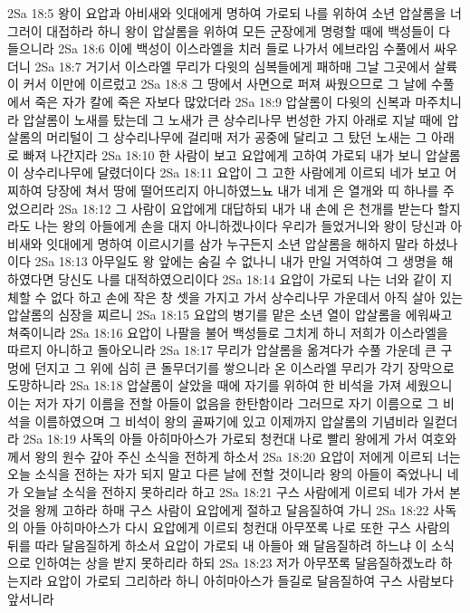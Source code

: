 2Sa 18:5  왕이 요압과 아비새와 잇대에게 명하여 가로되 나를 위하여 소년 압살롬을 너그러이 대접하라 하니 왕이 압살롬을 위하여 모든 군장에게 명령할 때에 백성들이 다 들으니라
2Sa 18:6  이에 백성이 이스라엘을 치러 들로 나가서 에브라임 수풀에서 싸우더니
2Sa 18:7  거기서 이스라엘 무리가 다윗의 심복들에게 패하매 그날 그곳에서 살륙이 커서 이만에 이르렀고
2Sa 18:8  그 땅에서 사면으로 퍼져 싸웠으므로 그 날에 수풀에서 죽은 자가 칼에 죽은 자보다 많았더라
2Sa 18:9  압살롬이 다윗의 신복과 마주치니라 압살롬이 노새를 탔는데 그 노새가 큰 상수리나무 번성한 가지 아래로 지날 때에 압살롬의 머리털이 그 상수리나무에 걸리매 저가 공중에 달리고 그 탔던 노새는 그 아래로 빠져 나간지라
2Sa 18:10  한 사람이 보고 요압에게 고하여 가로되 내가 보니 압살롬이 상수리나무에 달렸더이다
2Sa 18:11  요압이 그 고한 사람에게 이르되 네가 보고 어찌하여 당장에 쳐서 땅에 떨어뜨리지 아니하였느뇨 내가 네게 은 열개와 띠 하나를 주었으리라
2Sa 18:12  그 사람이 요압에게 대답하되 내가 내 손에 은 천개를 받는다 할지라도 나는 왕의 아들에게 손을 대지 아니하겠나이다 우리가 들었거니와 왕이 당신과 아비새와 잇대에게 명하여 이르시기를 삼가 누구든지 소년 압살롬을 해하지 말라 하셨나이다
2Sa 18:13  아무일도 왕 앞에는 숨길 수 없나니 내가 만일 거역하여 그 생명을 해하였다면 당신도 나를 대적하였으리이다
2Sa 18:14  요압이 가로되 나는 너와 같이 지체할 수 없다 하고 손에 작은 창 셋을 가지고 가서 상수리나무 가운데서 아직 살아 있는 압살롬의 심장을 찌르니
2Sa 18:15  요압의 병기를 맡은 소년 열이 압살롬을 에워싸고 쳐죽이니라
2Sa 18:16  요압이 나팔을 불어 백성들로 그치게 하니 저희가 이스라엘을 따르지 아니하고 돌아오니라
2Sa 18:17  무리가 압살롬을 옮겨다가 수풀 가운데 큰 구멍에 던지고 그 위에 심히 큰 돌무더기를 쌓으니라 온 이스라엘 무리가 각기 장막으로 도망하니라
2Sa 18:18  압살롬이 살았을 때에 자기를 위하여 한 비석을 가져 세웠으니 이는 저가 자기 이름을 전할 아들이 없음을 한탄함이라 그러므로 자기 이름으로 그 비석을 이름하였으며 그 비석이 왕의 골짜기에 있고 이제까지 압살롬의 기념비라 일컫더라
2Sa 18:19  사독의 아들 아히마아스가 가로되 청컨대 나로 빨리 왕에게 가서 여호와께서 왕의 원수 갚아 주신 소식을 전하게 하소서
2Sa 18:20  요압이 저에게 이르되 너는 오늘 소식을 전하는 자가 되지 말고 다른 날에 전할 것이니라 왕의 아들이 죽었나니 네가 오늘날 소식을 전하지 못하리라 하고
2Sa 18:21  구스 사람에게 이르되 네가 가서 본 것을 왕께 고하라 하매 구스 사람이 요압에게 절하고 달음질하여 가니
2Sa 18:22  사독의 아들 아히마아스가 다시 요압에게 이르되 청컨대 아무쪼록 나로 또한 구스 사람의 뒤를 따라 달음질하게 하소서 요압이 가로되 내 아들아 왜 달음질하려 하느냐 이 소식으로 인하여는 상을 받지 못하리라 하되
2Sa 18:23  저가 아무쪼록 달음질하겠노라 하는지라 요압이 가로되 그리하라 하니 아히마아스가 들길로 달음질하여 구스 사람보다 앞서니라
